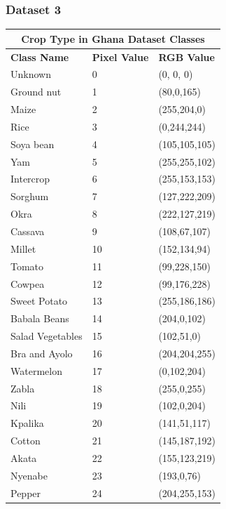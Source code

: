 \documentclass[conference]{IEEEtran}
\begin{document}
\subsubsection{Dataset 3}

\begin{table}[htbp]
\centering
\begin{tabular}{|p{2.2cm}|p{0.7cm}|p{1.6cm}|}
 \hline
 \multicolumn{3}{|c|}{\textbf{Crop Type in Ghana Dataset Classes}} \\
 \hline
 \textbf{Class Name} & \textbf{Pixel Value}& \textbf{RGB Value} \\
 \hline
  Unknown & 0  &  (0, 0, 0)\\ 
 \hline
  Ground nut & 1  & (80,0,165) \\ 
 \hline
  Maize & 2  & (255,204,0) \\ 
 \hline
  Rice & 3  & (0,244,244)\\ 
 \hline
  Soya bean & 4  & (105,105,105)\\ 
 \hline
  Yam & 5  & (255,255,102) \\ 
 \hline
  Intercrop & 6  & (255,153,153)\\ 
 \hline
  Sorghum & 7  & (127,222,209)\\ 
 \hline
  Okra & 8  & (222,127,219)\\ 
 \hline
  Cassava & 9  & (108,67,107)\\ 
 \hline
  Millet & 10  & (152,134,94)\\ 
 \hline
  Tomato & 11 & (99,228,150) \\ 
 \hline
  Cowpea & 12  & (99,176,228)\\ 
 \hline
  Sweet Potato & 13 & (255,186,186)\\ 
 \hline
  Babala Beans & 14  & (204,0,102) \\ 
 \hline
  Salad Vegetables & 15  & (102,51,0)\\ 
 \hline
  Bra and Ayolo  & 16  & (204,204,255)\\ 
 \hline
  Watermelon & 17  & (0,102,204)\\ 
 \hline
  Zabla & 18 & (255,0,255)\\ 
 \hline
  Nili & 19 & (102,0,204)\\ 
 \hline
  Kpalika & 20 & (141,51,117)\\ 
 \hline
  Cotton & 21 & (145,187,192)\\ 
 \hline
  Akata & 22 & (155,123,219)\\ 
 \hline
  Nyenabe & 23 & (193,0,76)\\ 
 \hline
  Pepper & 24 & (204,255,153)\\ 
 \hline
\end{tabular}
\label{landcover_ai_classes}
\end{table}
\end{document}
